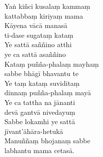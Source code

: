 Yaṅ kiñci kusalaṃ kammaṃ\\
\vin kattabbaṃ kiriyaṃ mama\\
Kāyena vācā manasā\\
\vin ti-dase sugataṃ kataṃ\\
Ye sattā saññino atthi\\
\vin ye ca sattā asaññino\\
Kataṃ puñña-phalaṃ mayhaṃ\\
\vin sabbe bhāgī bhavantu te\\
Ye taṃ kataṃ suviditaṃ\\
\vin dinnaṃ puñña-phalaṃ mayā\\
Ye ca tattha na jānanti\\
\vin devā gantvā nivedayuṃ\\
Sabbe lokamhi ye sattā\\
\vin jīvant'āhāra-hetukā\\
Manuññaṃ bhojanaṃ sabbe\\
\vin labhantu mama cetasā.


